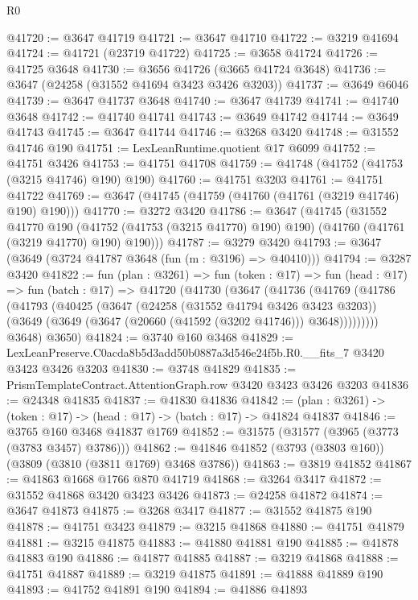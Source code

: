 \begin{lexlean}{R0}
\begin{coremodule}
@41720 := @3647 @41719
@41721 := @3647 @41710
@41722 := @3219 @41694
@41724 := @41721 (@23719 @41722)
@41725 := @3658 @41724
@41726 := @41725 @3648
@41730 := @3656 @41726 (@3665 @41724 @3648)
@41736 := @3647 (@24258 (@31552 @41694 @3423 @3426 @3203))
@41737 := @3649 @6046
@41739 := @3647 @41737 @3648
@41740 := @3647 @41739
@41741 := @41740 @3648
@41742 := @41740 @41741
@41743 := @3649 @41742
@41744 := @3649 @41743
@41745 := @3647 @41744
@41746 := @3268 @3420
@41748 := @31552 @41746 @190
@41751 := LexLeanRuntime.quotient @17 @6099
@41752 := @41751 @3426
@41753 := @41751 @41708
@41759 := @41748 (@41752 (@41753 (@3215 @41746) @190) @190)
@41760 := @41751 @3203
@41761 := @41751 @41722
@41769 := @3647 (@41745 (@41759 (@41760 (@41761 (@3219 @41746) @190) @190)))
@41770 := @3272 @3420
@41786 := @3647
    (@41745
      (@31552
        @41770
        @190
        (@41752 (@41753 (@3215 @41770) @190) @190)
        (@41760 (@41761 (@3219 @41770) @190) @190)))
@41787 := @3279 @3420
@41793 := @3647 (@3649 (@3724 @41787 @3648 (fun (m : @3196) => @40410)))
@41794 := @3287 @3420
@41822 := fun (plan : @3261) =>
  fun (token : @17) =>
  fun (head : @17) =>
  fun (batch : @17) =>
  @41720
    (@41730
      (@3647
        (@41736
          (@41769
            (@41786
              (@41793
                (@40425
                  (@3647
                    (@24258 (@31552 @41794 @3426 @3423 @3203))
                    (@3649 (@3649 (@3647 (@20660 (@41592 (@3202 @41746))) @3648)))))))))
        @3648)
      @3650)
@41824 := @3740 @160 @3468
@41829 := LexLeanPreserve.C0acda8b5d3add50b0887a3d546e24f5b.R0.__fits_7 @3420 @3423 @3426 @3203
@41830 := @3748 @41829
@41835 := PrismTemplateContract.AttentionGraph.row @3420 @3423 @3426 @3203
@41836 := @24348 @41835
@41837 := @41830 @41836
@41842 := (plan : @3261) -> (token : @17) -> (head : @17) -> (batch : @17) -> @41824 @41837
@41846 := @3765 @160 @3468 @41837 @1769
@41852 := @31575 (@31577 (@3965 (@3773 (@3783 @3457) @3786)))
@41862 := @41846 @41852 (@3793 (@3803 @160)) (@3809 (@3810 (@3811 @1769) @3468 @3786))
@41863 := @3819 @41852
@41867 := @41863 @1668 @1766 @870 @41719
@41868 := @3264 @3417
@41872 := @31552 @41868 @3420 @3423 @3426
@41873 := @24258 @41872
@41874 := @3647 @41873
@41875 := @3268 @3417
@41877 := @31552 @41875 @190
@41878 := @41751 @3423
@41879 := @3215 @41868
@41880 := @41751 @41879
@41881 := @3215 @41875
@41883 := @41880 @41881 @190
@41885 := @41878 @41883 @190
@41886 := @41877 @41885
@41887 := @3219 @41868
@41888 := @41751 @41887
@41889 := @3219 @41875
@41891 := @41888 @41889 @190
@41893 := @41752 @41891 @190
@41894 := @41886 @41893

\end{coremodule}
\end{lexlean}
